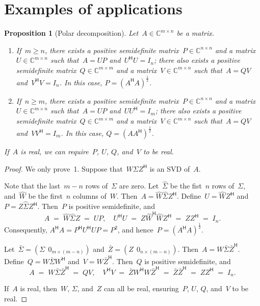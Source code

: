 \documentclass[11pt,a4paper]{article}
\newtheorem{proposition}{Proposition}%
\theoremstyle{definition}
\def\CC{\mathbb{C}}
\newcommand{\hmt}{{\scriptscriptstyle{{\mathsf{H}}}}}
\begin{document}
\section{Examples of applications}

\begin{proposition}[Polar decomposition]
  \label{th:polar} Let~$A \in \CC^{m\times n}$ be a matrix.
  \begin{enumerate}[leftmargin=1.5em]
    \item If~$m\ge n$, there exists a positive semidefinite matrix~$P \in \CC^{n\times n}$ and
      a matrix~$U\in \CC^{m\times n}$ such that~$A = UP$ and~$U^\hmt U = I_n$; there also exists
      a positive semidefinite matrix~$Q\in \CC^{m\times m}$ and a matrix~$V\in\CC^{m\times n}$ such
      that~$A = QV$ and~$V^\hmt V = I_n$.
      In this case, $P = (A^\hmt A)^{\frac{1}{2}}$.
    \item If~$n\ge m$, there exists a positive semidefinite matrix~$P \in \CC^{n\times n}$ and
      a matrix~$U\in \CC^{m\times n}$ such that~$A = UP$ and~$UU^\hmt = I_m$; there also exists
      a positive semidefinite matrix~$Q\in \CC^{m\times m}$ and a matrix~$V\in\CC^{m\times n}$ such
      that~$A = QV$ and~$V V^\hmt = I_m$. In this case, $Q = (AA^\hmt)^{\frac{1}{2}}$.
  \end{enumerate}
   If~$A$ is real, we can require~$P$, $U$, $Q$, and~$V$ to be real. 
\end{proposition}

\begin{proof}
  We only prove~1.
  Suppose that~$ W\Sigma Z^\hmt$ is an SVD of~$A$. 

  Note that the last~$m-n$ rows of~$\Sigma$ are zero. 
  Let~$\hat{\Sigma}$ be the fist~$n$ rows of~$\Sigma$, and~$\hat{W}$ be the first~$n$ columns
  of~$W$. Then~$A = \hat{W}\hat{\Sigma}Z^\hmt $. Define~$U = \hat{W}Z^\hmt$ and~$P
  = Z\hat{\Sigma} Z^\hmt$. Then~$P$ is positive semidefinite, and
  \begin{equation*}
    A \;=\; \hat{W}\hat{\Sigma} Z\;=\; UP,\quad 
    U^\hmt U \;=\; Z\hat{W}^\hmt \hat{W} Z^\hmt \;=\;ZZ^\hmt \;=\; I_n.
  \end{equation*}
  Consequently, $A^\hmt A  =  P^\hmt U^\hmt U P = P^2$, and hence~$P = (A^\hmt
  A)^{\frac{1}{2}}$. 

  Let~$\bar{\Sigma} = (\Sigma\;\, 0_{m\times(m-n)})$ and~$\bar{Z} = (Z\;\,0_{n\times (m-n)})$.
  Then~$A = W\bar{\Sigma} \bar{Z}^\hmt$. Define~$Q = W\bar{\Sigma} W^\hmt$ and~$V = W\bar{Z}^\hmt$.
  Then~$Q$ is positive semidefinite, and
  \begin{equation*}
    A\;=\; W\bar{\Sigma}\bar{Z}^\hmt \;=\; QV, \quad 
    V^\hmt V \;=\; \bar{Z}W^\hmt W \bar{Z}^\hmt \;=\; \bar{Z}\bar{Z}^\hmt \;=\; ZZ^\hmt \;=\; I_n.
  \end{equation*}

  If~$A$ is real, then~$W$, $\Sigma$, and~$Z$ can all be real,
  ensuring~$P$, $U$, $Q$, and~$V$ to be real.
\end{proof}
\end{document}
